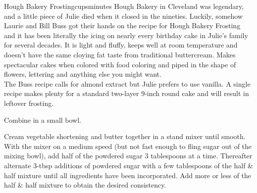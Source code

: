 \begin{recipe}{Hough Bakery Frosting}{\unit[6]{cups}}{\unit[20]{minutes}}
\freeform Hough Bakery in Cleveland was legendary, and a little piece
of Julie died when it closed in the nineties. Luckily, somehow Laurie
and Bill Buss got their hands on the recipe for Hough Bakery Frosting
and it has been literally the icing on nearly every birthday cake in
Julie's family for several decades. It is light and fluffy, keeps well
at room temperature and doesn't have the same cloying fat taste from
traditional buttercream. Makes spectacular cakes when colored with
food coloring and piped in the shape of flowers, lettering and
anything else you might want.\\

The Buss recipe calls for almond extract but Julie prefers to use
vanilla. A single recipe makes plenty for a standard two-layer 9-inch
round cake and will result in leftover frosting.

Combine in a small bowl.

Cream vegetable shortening and butter together in a stand mixer until
smooth. With the mixer on a medium speed (but not fast enough to fling
sugar out of the mixing bowl), add half of the powdered sugar 3
tablespoons at a time. Thereafter alternate 3-tbsp additions of
powdered sugar with a few tablespoons of the half \& half mixture
until all ingredients have been incorporated. Add more or less of the
half \& half mixture to obtain the desired consistency.
\end{recipe}
